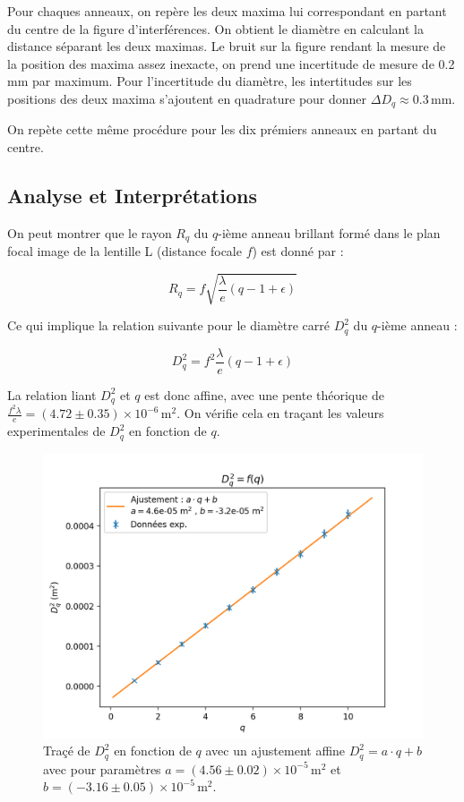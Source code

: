 \documentclass{article}
\begin{document}
Pour chaques anneaux, on repère les deux maxima lui correspondant en partant du centre de la figure d'interférences. 
On obtient le diamètre en calculant la distance séparant les deux maximas. 
Le bruit sur la figure rendant la mesure de la position des maxima assez inexacte, on prend une 
incertitude de mesure de 0.2 mm par maximum. Pour l'incertitude du diamètre, les intertitudes 
sur les positions des deux maxima s'ajoutent en quadrature pour donner 
$\Delta D_q \approx 0.3 \,\textrm{mm}$. 

On repète cette même procédure pour les dix prémiers anneaux en partant du centre.


\subsection{Analyse et Interprétations}

On peut montrer que le rayon $R_q$ du $q$-ième anneau brillant formé dans le plan focal image
de la lentille L (distance focale $f$) est donné par :

\begin{equation}
    R_q = f \sqrt{\frac{\lambda}{e}(q-1+\epsilon)}
\end{equation}

Ce qui implique la relation suivante pour le diamètre carré $D_q^2$ du $q$-ième anneau :

\begin{equation}
    D_q^2 = f^2 \frac{\lambda}{e}(q-1+\epsilon)
    \label{eq:dq2}
\end{equation}

La relation liant $D_q^2$ et $q$ est donc affine, avec une pente théorique de $ \frac{f^2 \lambda}{e} = (4.72\pm0.35)\times10^{-6} \,\textrm{m}^2$.
On vérifie cela en traçant les valeurs experimentales de $D_q^2$ en fonction de $q$.

\begin{figure}[H]
    \centering
    \includegraphics[width=0.6\linewidth]{figs/D2_q.png}
    \caption{Traçé de $D_q^2$ en fonction de $q$ avec un ajustement affine $D_q^2=a\cdot q+b$ avec pour paramètres 
    $a=(4.56\pm0.02)\times10^{-5} \,\textrm{m}^2$ et $b = (-3.16 \pm 0.05) \times 10^{-5} \,\textrm{m}^2$.}
\end{figure}
\end{document}
